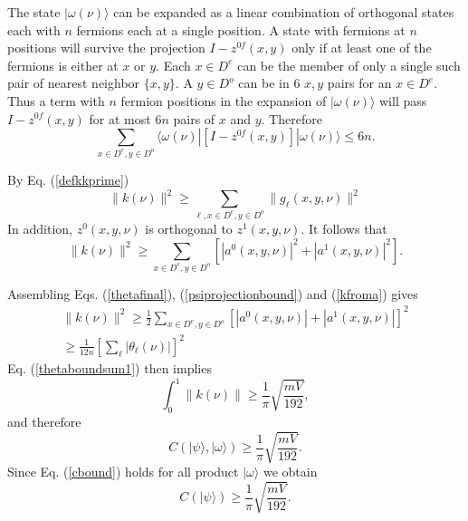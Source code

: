 \documentclass[twocolumn,amsmath,amssymb]{revtex4-1}
\begin{document}
The state $|\omega(\nu) \rangle $ can be expanded as a linear combination of orthogonal states 
each with 
$n$ fermions each at a single position. A state with fermions at $n$
positions will survive the projection
$I - z^{0f}(x,y)$ only if at least one of the fermions is either at $x$ or $y$.
Each $x \in D^e$ can be the member of only a single such pair of nearest
neighbor $\{x, y\}$. A $y \in D^o$ can be in 6 $x, y$ pairs for an
$x \in D^e$. Thus a term with $n$ fermion positions in the
expansion of $|\omega(\nu) \rangle $ will pass $I - z^{0f}(x,y)$ for 
at most $6n$ pairs of $x$ and $y$. Therefore 
\begin{equation}
\label{psiprojectionbound}
\sum_{x \in D^e, y \in D^o}  \langle \omega(\nu)| [I - z^{0f}(x,y)]|\omega(\nu) \rangle  \le 6n.
\end{equation}




By Eq. (\ref{defkkprime}) 
\begin{equation}
\label{kfroma0}
\parallel k(\nu) \parallel ^ 2  \ge  \sum_{\ell, x \in D^e, y \in D^o} \parallel g_\ell( x, y, \nu) \parallel^2
\end{equation}
In addition, $z^0(x,y,\nu)$ is orthogonal
to $z^1(x, y, \nu)$. It follows that
\begin{equation}
\label{kfroma}
\parallel k(\nu) \parallel^2 \ge \sum_{x \in D^e, y \in D^o} [|a^0(x,y,\nu)|^2 + |a^1(x,y,\nu)|^2].
\end{equation}




Assembling Eqs. (\ref{thetafinal}), (\ref{psiprojectionbound})
and (\ref{kfroma}) gives
\begin{multline}
\label{kbound}
\parallel k(\nu) \parallel^2 \ge \frac{1}{2} \sum_{x \in D^e, y \in D^o} [|a^0(x,y,\nu)| + |a^1(x,y,\nu)|]^2 \\
\ge \frac{1}{12 n} [\sum_{\ell} |\theta_{\ell}(\nu)|] ^ 2
\end{multline}
Eq. (\ref{thetaboundsum1}) then implies
\begin{equation}
\label{kbound1}
\int_0^1 \parallel k(\nu) \parallel \ge \frac{1}{\pi} \sqrt{ \frac{ mV}{192}},
\end{equation}
and therefore
\begin{equation}
\label{cbound}
C( |\psi \rangle , |\omega \rangle ) \ge \frac{1}{\pi}\sqrt{ \frac{ mV}{192}}.
\end{equation}
Since Eq. (\ref{cbound}) holds for all product $|\omega \rangle $
we obtain
\begin{equation}
\label{cbound2}
C( |\psi \rangle ) \ge \frac{1}{\pi} \sqrt{ \frac{ mV}{192}}.
\end{equation}
\end{document}
